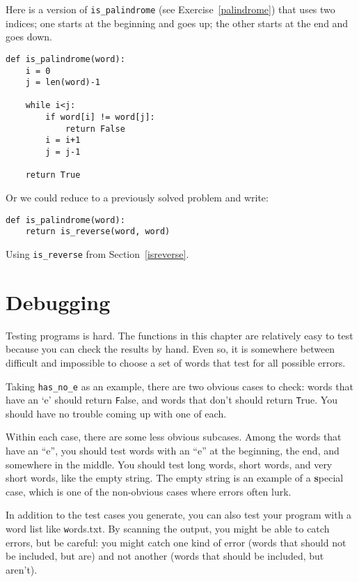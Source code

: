 \documentclass[
DIV=11,
fontsize=12,
twoside,
headinclude=false,
titlepage=firstiscover,
abstract=true,
headsepline=true,
footsepline=true,
chapterprefix=true, %
headings=big,
bibliography=totoc,%
captions=tableheading
]{scrbook}
\theoremstyle{definition}
\begin{document}
Here is a version of \verb"is_palindrome" (see
Exercise~\ref{palindrome}) that uses two indices; one starts at the
beginning and goes up; the other starts at the end and goes down.

\begin{lstlisting}
def is_palindrome(word):
    i = 0
    j = len(word)-1

    while i<j:
        if word[i] != word[j]:
            return False
        i = i+1
        j = j-1

    return True
\end{lstlisting}

Or we could reduce to a previously solved
problem and write:

\begin{lstlisting}
def is_palindrome(word):
    return is_reverse(word, word)
\end{lstlisting}
%
Using \verb"is_reverse" from Section~\ref{isreverse}.


\section{Debugging}

Testing programs is hard.  The functions in this chapter are
relatively easy to test because you can check the results by hand.
Even so, it is somewhere between difficult and impossible to choose a
set of words that test for all possible errors.

Taking \verb"has_no_e" as an example, there are two obvious
cases to check: words that have an `e' should return {\texttt False}, and
words that don't should return {\texttt True}.  You should have no
trouble coming up with one of each.

Within each case, there are some less obvious subcases.  Among the
words that have an ``e'', you should test words with an ``e'' at the
beginning, the end, and somewhere in the middle.  You should test long
words, short words, and very short words, like the empty string.  The
empty string is an example of a {\textbf special case}, which is one of
the non-obvious cases where errors often lurk.

In addition to the test cases you generate, you can also test
your program with a word list like {\texttt words.txt}.  By scanning
the output, you might be able to catch errors, but be careful:
you might catch one kind of error (words that should not be
included, but are) and not another (words that should be included,
but aren't).
\end{document}
